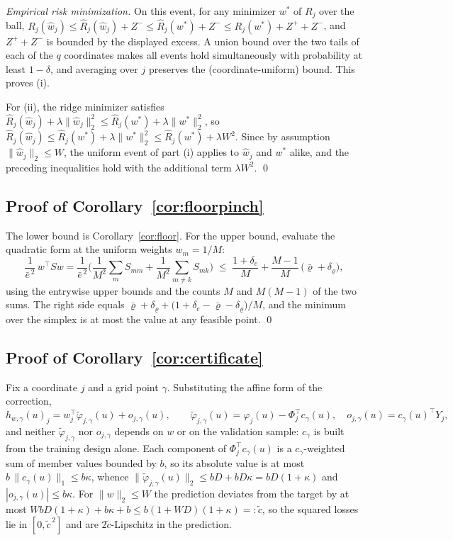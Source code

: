 \emph{Empirical risk minimization.} On this event, for any minimizer
$w^\ast$ of $R_j$ over the ball,
$R_j(\widehat w_j)\le\widehat R_j(\widehat w_j)+Z^{-}
\le\widehat R_j(w^\ast)+Z^{-}\le R_j(w^\ast)+Z^{+}+Z^{-}$, and
$Z^{+}+Z^{-}$ is bounded by the displayed excess. A union bound over the two
tails of each of the $q$ coordinates makes all events
hold simultaneously with probability at least $1-\delta$, and averaging over
$j$ preserves the (coordinate-uniform) bound. This proves (i).

For (ii), the ridge minimizer satisfies
$\widehat R_j(\widehat w_j)+\lambda\|\widehat w_j\|_2^2\le
\widehat R_j(w^\ast)+\lambda\|w^\ast\|_2^2$, so
$\widehat R_j(\widehat w_j)\le\widehat R_j(w^\ast)+\lambda\|w^\ast\|_2^2
\le\widehat R_j(w^\ast)+\lambda W^2$. Since by assumption
$\|\widehat w_j\|_2\le W$, the uniform event of part (i) applies to
$\widehat w_j$ and $w^\ast$ alike, and the preceding inequalities hold with the
additional term $\lambda W^2$. \qed

\subsection{Proof of Corollary~\ref{cor:floorpinch}}
\label{proof:cor:floorpinch}

The lower bound is Corollary~\ref{cor:floor}. For the upper bound, evaluate
the quadratic form at the uniform weights $w_m=1/M$:
\[
\frac{1}{\bar e^{\,2}}\,w^\top Sw
=\frac{1}{\bar e^{\,2}}\Big(\frac{1}{M^2}\sum_m S_{mm}
+\frac{1}{M^2}\sum_{m\neq k}S_{mk}\Big)
\;\le\;\frac{1+\delta_e}{M}
+\frac{M-1}{M}\,\big(\bar\varrho+\delta_\varrho\big),
\]
using the entrywise upper bounds and the counts $M$ and $M(M-1)$ of the two
sums. The right side equals
$\bar\varrho+\delta_\varrho+\big(1+\delta_e-\bar\varrho-\delta_\varrho\big)/M$,
and the minimum over the simplex is at most the value at any feasible point.
\qed

\subsection{Proof of Corollary~\ref{cor:certificate}}
\label{proof:cor:certificate}

Fix a coordinate $j$ and a grid point $\gamma$. Substituting the affine form
of the correction,
\[
h_{w,\gamma}(u)_j=w_j^\top\widetilde\varphi_{j,\gamma}(u)+o_{j,\gamma}(u),
\qquad
\widetilde\varphi_{j,\gamma}(u)=\varphi_j(u)-\Phi_j^\top c_\gamma(u),\quad
o_{j,\gamma}(u)=c_\gamma(u)^\top Y_j ,
\]
and neither $\widetilde\varphi_{j,\gamma}$ nor $o_{j,\gamma}$ depends on $w$
or on the validation sample: $c_\gamma$ is built from the training design
alone. Each component of $\Phi_j^\top c_\gamma(u)$ is a $c_\gamma$-weighted
sum of member values bounded by $b$, so its absolute value is at most
$b\,\|c_\gamma(u)\|_1\le b\kappa$, whence
$\|\widetilde\varphi_{j,\gamma}(u)\|_2\le bD+bD\kappa=bD(1+\kappa)$ and
$|o_{j,\gamma}(u)|\le b\kappa$. For $\|w\|_2\le W$ the prediction deviates
from the target by at most
$WbD(1+\kappa)+b\kappa+b\le b(1+WD)(1+\kappa)=:\tilde c$, so the squared
losses lie in $[0,\tilde c^{\,2}]$ and are $2\tilde c$-Lipschitz in the
prediction.

